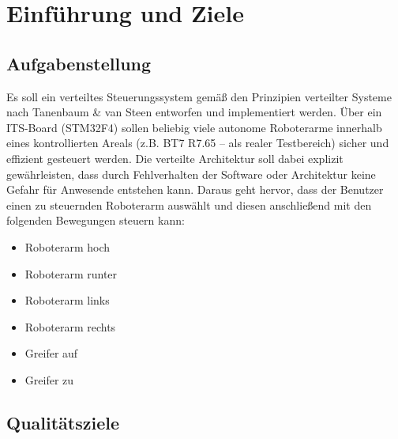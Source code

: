 \chapter{Einführung und Ziele}

\section{Aufgabenstellung}

Es soll ein verteiltes Steuerungssystem gemäß den Prinzipien verteilter Systeme nach Tanenbaum \& van Steen entworfen und implementiert werden. Über ein ITS-Board (STM32F4) sollen beliebig viele autonome Roboterarme innerhalb eines kontrollierten Areals (z.B. BT7 R7.65 – als realer Testbereich) sicher und effizient gesteuert werden. Die verteilte Architektur soll dabei explizit gewährleisten, dass durch Fehlverhalten der Software oder Architektur keine Gefahr für Anwesende entstehen kann. Daraus geht hervor, dass der Benutzer einen zu steuernden Roboterarm auswählt und diesen anschließend mit den folgenden Bewegungen steuern kann:

\begin{itemize}
	\item Roboterarm hoch
	\item Roboterarm runter
	\item Roboterarm links
	\item Roboterarm rechts
	\item Greifer auf
	\item Greifer zu
	
\end{itemize}


\newpage
\section{Qualitätsziele}

